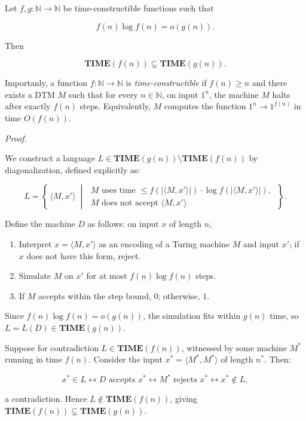 \documentclass[12pt,a4paper,openany]{article}
\begin{document}
Let $f, g : \mathbb{N} \to \mathbb{N}$ be time-constructible functions such that

\[
f(n) \log f(n) = o(g(n)).
\]

Then

\[
\mathbf{TIME}(f(n)) \subsetneq \mathbf{TIME}(g(n)).
\]


Importanly, a function $f : \mathbb{N} \to \mathbb{N}$ is \emph{time-constructible} if
$f(n) \geq n$ and there exists a DTM $M$ such that
for every $n \in \mathbb{N}$, on input $1^n$, the machine $M$ halts after
exactly $f(n)$ steps. Equivalently, $M$ computes the function
$1^n \to 1^{f(n)}$ in time $O(f(n))$.
 
\emph{Proof.}

We construct a language $L \in \mathbf{TIME}(g(n)) \setminus \mathbf{TIME}(f(n))$
by diagonalization, defined explicitly as:

\[
L = \left\{\, \langle M, x' \rangle \;\middle|\;
\begin{array}{l}
M \text{ uses time } \leq f\!\left(\big|\langle M, x' \rangle\big|\right) \cdot
\log f\!\left(\big|\langle M, x' \rangle\big|\right), \\
M \text{ does not accept } \langle M, x' \rangle
\end{array}
\,\right\}.
\]

Define the machine $D$ as follows: on input $x$ of length $n$,

\begin{enumerate}
    \item Interpret $x = \langle M, x' \rangle$ as an encoding of a Turing machine $M$
    and input $x'$; if $x$ does not have this form, reject.
    \item Simulate $M$ on $x'$ for at most $f(n) \log f(n)$ steps.
    \item If $M$ accepts within the step bound, $0$; otherwise, $1$.
\end{enumerate}

Since $f(n)\log f(n) = o(g(n))$, the simulation fits within $g(n)$ time, so
$L = L(D) \in \mathbf{TIME}(g(n))$.

Suppose for contradiction $L \in \mathbf{TIME}(f(n))$, witnessed by some machine $M^*$
running in time $f(n)$. Consider the input $x^* = \langle M^*, M^* \rangle$ of length $n^*$.
Then:

\[
x^* \in L \leftrightarrow D \text{ accepts } x^* \leftrightarrow M^* \text{ rejects } x^* \leftrightarrow x^* \notin L,
\]

a contradiction. Hence $L \notin \mathbf{TIME}(f(n))$, giving
$\mathbf{TIME}(f(n)) \subsetneq \mathbf{TIME}(g(n))$.
\end{document}
